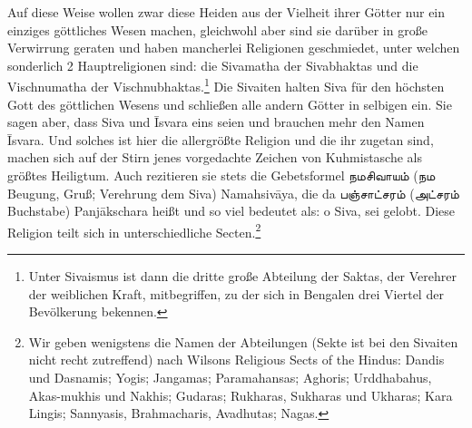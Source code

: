 \documentclass{article}
\newcommand{\TamilText}[1]{\texttamil{#1}}
\newcommand{\tam}[1]{\TamilText{#1}}
\begin{document}
Auf diese Weise wollen zwar diese Heiden aus der Vielheit ihrer Götter nur ein einziges göttliches Wesen machen, gleichwohl aber sind sie darüber in große Verwirrung geraten und haben mancherlei Religionen geschmiedet, unter welchen sonderlich 2 Hauptreligionen sind: die Sivamatha der Sivabhaktas und die Vischnumatha der Vischnubhaktas.\footnote{Unter Sivaismus ist dann die dritte große Abteilung der Saktas, der Verehrer der weiblichen Kraft, mitbegriffen, zu der sich in Bengalen drei Viertel der Bevölkerung bekennen.} Die Sivaiten halten Siva für den höchsten Gott des göttlichen Wesens und schließen alle andern Götter in selbigen ein. Sie sagen aber, dass Siva und \={I}svara eins seien und brauchen mehr den Namen \={I}svara. Und solches ist hier die allergrößte Religion und die ihr zugetan sind, machen sich auf der Stirn jenes vorgedachte Zeichen von Kuhmistasche als größtes Heiligtum. Auch rezitieren sie stets die Gebetsformel \tam{நமசிவாயம்} (\tam{நம} Beugung, Gruß; Verehrung dem Siva) Namahsiv\={a}ya, die da \tam{பஞ்சாட்சரம்} (\tam{அட்சரம்} Buchstabe) Panj\={a}kschara heißt und so viel bedeutet als: o Siva, sei gelobt. Diese Religion teilt sich in unterschiedliche Secten.\footnote{Wir geben wenigstens die Namen der Abteilungen (Sekte ist bei den Sivaiten nicht recht zutreffend) nach Wilsons Religious Sects of the Hindus: Dandis und Dasnamis; Yogis; Jangamas; Paramahansas; Aghoris; Urddhabahus, Akas-mukhis und Nakhis; Gudaras; Rukharas, Sukharas und Ukharas; Kara Lingis; Sannyasis, Brahmacharis, Avadhutas; Nagas.}
\end{document}
